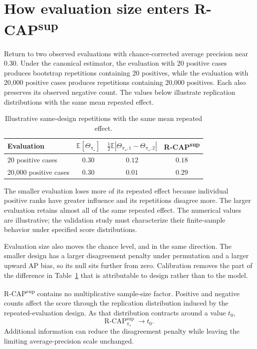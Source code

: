 \documentclass[11pt]{article}
\newcommand{\E}{\mathbb{E}}
\newcommand{\RCAP}{\operatorname{R\text{-}CAP}^{\mathrm{sup}}_{\pi_\star}}
\theoremstyle{remark}
\begin{document}
\section{How evaluation size enters R-CAP\textsuperscript{sup}}

Return to two observed evaluations with chance-corrected average precision near $0.30$. Under the canonical estimator, the evaluation with 20 positive cases produces bootstrap repetitions containing 20 positives, while the evaluation with 20,000 positive cases produces repetitions containing 20,000 positives. Each also preserves its observed negative count. The values below illustrate replication distributions with the same mean repeated effect.

\begin{table}[ht]
\centering
\caption{Illustrative same-design repetitions with the same mean repeated effect.}
\label{tab:illustration}
\begin{tabular}{@{}lccc@{}}
\toprule
Evaluation & $\E[\Theta_{\pi_\star}]$ & $\tfrac12\E|\Theta_{\pi_\star,1}-\Theta_{\pi_\star,2}|$ & R-CAP\textsuperscript{sup} \\
\midrule
20 positive cases & $0.30$ & $0.12$ & $0.18$ \\
20,000 positive cases & $0.30$ & $0.01$ & $0.29$ \\
\bottomrule
\end{tabular}
\end{table}

The smaller evaluation loses more of its repeated effect because individual positive ranks have greater influence and its repetitions disagree more. The larger evaluation retains almost all of the same repeated effect. The numerical values are illustrative; the validation study must characterize their finite-sample behavior under specified score distributions.

Evaluation size also moves the chance level, and in the same direction. The smaller design has a larger disagreement penalty under permutation and a larger upward AP bias, so its null sits further from zero. Calibration removes the part of the difference in Table~\ref{tab:illustration} that is attributable to design rather than to the model.

R-CAP\textsuperscript{sup} contains no multiplicative sample-size factor. Positive and negative counts affect the score through the replication distribution induced by the repeated-evaluation design. As that distribution contracts around a value $t_0$,
\[
\RCAP\longrightarrow t_0.
\]
Additional information can reduce the disagreement penalty while leaving the limiting average-precision scale unchanged.
\end{document}
